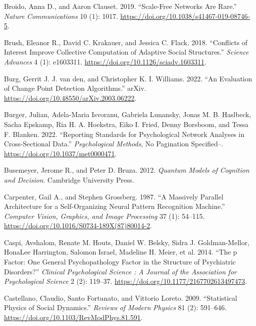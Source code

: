 \documentclass[
  a4paper,
  DIV=11,
  numbers=noendperiod,
  oneside]{scrreprt}
\newlength{\cslhangindent}
\newenvironment{CSLReferences}[2] %
 {\begin{list}{}{%
  \setlength{\itemindent}{0pt}
  \setlength{\leftmargin}{0pt}
  \setlength{\parsep}{0pt}
  \ifodd #1
   \setlength{\leftmargin}{\cslhangindent}
   \setlength{\itemindent}{-1\cslhangindent}
  \fi
  \setlength{\itemsep}{#2\baselineskip}}}
 {\end{list}}
\begin{document}
\begin{CSLReferences}{1}{0}
Broido, Anna D., and Aaron Clauset. 2019. {``Scale-Free Networks Are
Rare.''} \emph{Nature Communications} 10 (1): 1017.
\url{https://doi.org/10.1038/s41467-019-08746-5}.

Brush, Eleanor R., David C. Krakauer, and Jessica C. Flack. 2018.
{``Conflicts of Interest Improve Collective Computation of Adaptive
Social Structures.''} \emph{Science Advances} 4 (1): e1603311.
\url{https://doi.org/10.1126/sciadv.1603311}.

Burg, Gerrit J. J. van den, and Christopher K. I. Williams. 2022. {``An
{Evaluation} of {Change Point Detection Algorithms}.''} {arXiv}.
\url{https://doi.org/10.48550/arXiv.2003.06222}.

Burger, Julian, Adela-Maria Isvoranu, Gabriela Lunansky, Jonas M. B.
Haslbeck, Sacha Epskamp, Ria H. A. Hoekstra, Eiko I. Fried, Denny
Borsboom, and Tessa F. Blanken. 2022. {``Reporting Standards for
Psychological Network Analyses in Cross-Sectional Data.''}
\emph{Psychological Methods}, No Pagination Specified--.
\url{https://doi.org/10.1037/met0000471}.

Busemeyer, Jerome R., and Peter D. Bruza. 2012. \emph{Quantum {Models}
of {Cognition} and {Decision}}. {Cambridge University Press}.

Carpenter, Gail A., and Stephen Grossberg. 1987. {``A Massively Parallel
Architecture for a Self-Organizing Neural Pattern Recognition
Machine.''} \emph{Computer Vision, Graphics, and Image Processing} 37
(1): 54--115. \url{https://doi.org/10.1016/S0734-189X(87)80014-2}.

Caspi, Avshalom, Renate M. Houts, Daniel W. Belsky, Sidra J.
Goldman-Mellor, HonaLee Harrington, Salomon Israel, Madeline H. Meier,
et al. 2014. {``The p {Factor}: {One General Psychopathology Factor} in
the {Structure} of {Psychiatric Disorders}?''} \emph{Clinical
Psychological Science : A Journal of the Association for Psychological
Science} 2 (2): 119--37. \url{https://doi.org/10.1177/2167702613497473}.

Castellano, Claudio, Santo Fortunato, and Vittorio Loreto. 2009.
{``Statistical Physics of Social Dynamics.''} \emph{Reviews of Modern
Physics} 81 (2): 591--646.
\url{https://doi.org/10.1103/RevModPhys.81.591}.


\end{CSLReferences}
\end{document}
